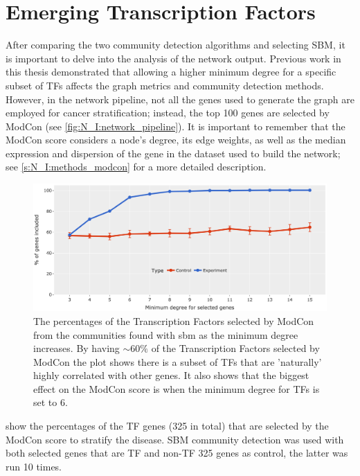 
\section{Emerging Transcription Factors} \label{s:N_I:sel_tfs}

After comparing the two community detection algorithms and selecting SBM, it is important to delve into the analysis of the network output. Previous work in this thesis demonstrated that allowing a higher minimum degree for a specific subset of TFs affects the graph metrics and community detection methods. However, in the network pipeline, not all the genes used to generate the graph are employed for cancer stratification; instead, the top 100 genes are selected by ModCon (see \cref{fig:N_I:network_pipeline}). It is important to remember that the ModCon score considers a node’s degree, its edge weights, as well as the median expression and dispersion of the gene in the dataset used to build the network; see \cref{s:N_I:methods_modcon} for a more detailed description.


\begin{figure}[!b]   
    \centering
    \includegraphics[width=1.0\textwidth,height=1.0\textheight,keepaspectratio]{Sections/Network_I/Resources/selective_pruning/com_comp/ctrls_min_dig_mev.png}
      \caption{The percentages of the Transcription Factors selected by ModCon from the communities found with \acrlong{sbm} as the minimum degree increases. By having $\sim60\%$ of the Transcription Factors selected by ModCon the plot shows there is a subset of TFs that are 'naturally' highly correlated with other genes. It also shows that the biggest effect on the ModCon score is when the minimum degree for TFs is set to 6.}
    \label{fig:N_I:sel_tfs}
\end{figure}

 show the percentages of the TF genes (325 in total) that are selected by the ModCon score to stratify the disease. SBM community detection was used with both selected genes that are TF and non-TF 325 genes as control, the latter was run 10 times.

